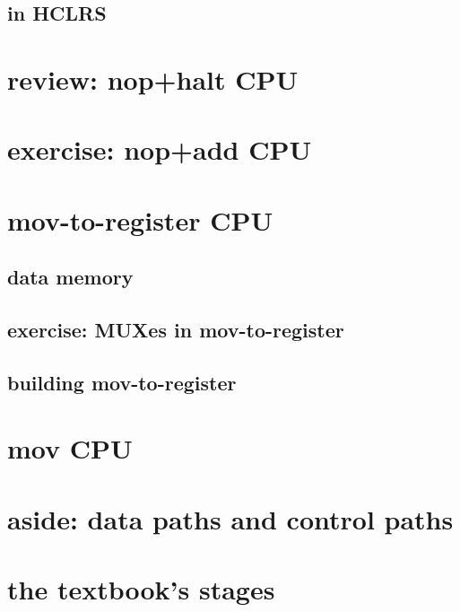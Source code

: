 \subsection{in HCLRS}



\section{review: nop+halt CPU}

\section{exercise: nop+add CPU}

\section{mov-to-register CPU}



\subsection{data memory}


\subsection{exercise: MUXes in mov-to-register}


\subsection{building mov-to-register}


\section{mov CPU}


\section{aside: data paths and control paths}



\section{the textbook's stages}

